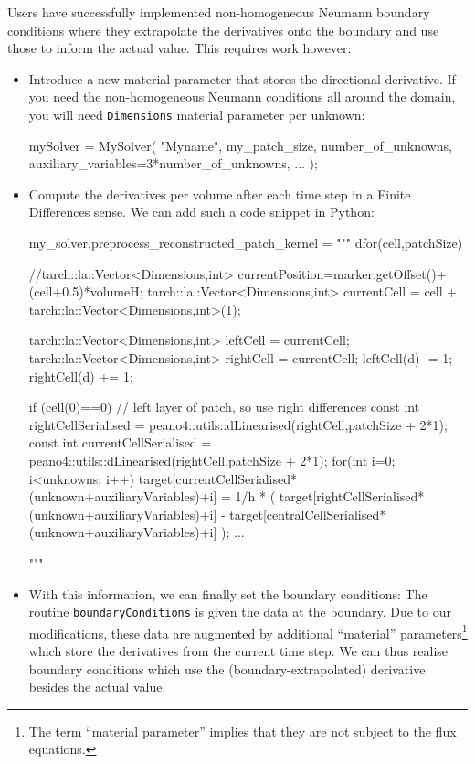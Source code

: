 Users have successfully implemented non-homogeneous Neumann boundary
conditions where they extrapolate the derivatives onto the boundary and use
those to inform the actual value.
This requires work however:

\begin{itemize}
  \item Introduce a new material parameter that stores the directional
  derivative. If you need the non-homogeneous Neumann conditions all around the
  domain, you will need \texttt{Dimensions} material parameter per unknown:
  \begin{code}
mySolver = MySolver( "Myname", my_patch_size, number_of_unknowns,
  auxiliary_variables=3*number_of_unknowns, ... );
  \end{code}
  \item Compute the derivatives per volume after each time step in a Finite
  Differences sense. We can add such a code snippet in Python:
  \begin{code}
my_solver.preprocess_reconstructed_patch_kernel = """
  dfor(cell,patchSize) {
    //tarch::la::Vector<Dimensions,int> currentPosition=marker.getOffset()+(cell+0.5)*volumeH;
    tarch::la::Vector<Dimensions,int> currentCell = cell + tarch::la::Vector<Dimensions,int>(1);

    tarch::la::Vector<Dimensions,int> leftCell  = currentCell;
    tarch::la::Vector<Dimensions,int> rightCell = currentCell;
    leftCell(d)  -= 1;
    rightCell(d) += 1;

    if (cell(0)==0) { // left layer of patch, so use right differences
      const int rightCellSerialised  =
        peano4::utils::dLinearised(rightCell,patchSize + 2*1); 
      const int currentCellSerialised = 
        peano4::utils::dLinearised(rightCell,patchSize + 2*1); 
      for(int i=0; i<unknowns; i++) { 
        target[currentCellSerialised*(unknown+auxiliaryVariables)+i] = 
         1/h * (
           target[rightCellSerialised*(unknown+auxiliaryVariables)+i] -
           target[centralCellSerialised*(unknown+auxiliaryVariables)+i]
         );
  ...
      }}}"""
\end{code}
  \item With this information, we can finally set the boundary conditions:
  The routine \texttt{boundaryConditions} is given the data at the boundary.
  Due to our modifications, these data are augmented by additional ``material''
  parameters\footnote{The term ``material parameter'' implies that they are not
  subject to the flux equations.} which store the derivatives from the current
  time step.
  We can thus realise boundary conditions which use the (boundary-extrapolated)
  derivative besides the actual value.
\end{itemize}



